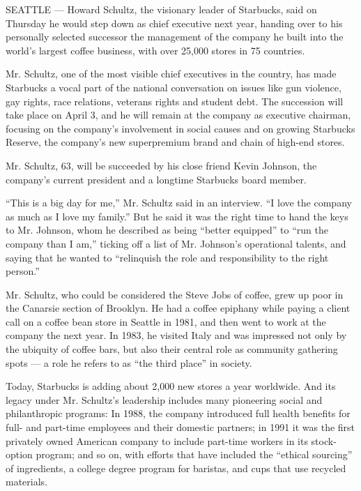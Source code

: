 SEATTLE --- Howard Schultz, the visionary leader of Starbucks, said on
Thursday he would step down as chief executive next year, handing over
to his personally selected successor the management of the company he
built into the world's largest coffee business, with over 25,000 stores
in 75 countries.

Mr. Schultz, one of the most visible chief executives in the country,
has made Starbucks a vocal part of the national conversation on issues
like gun violence, gay rights, race relations, veterans rights and
student debt. The succession will take place on April 3, and he will
remain at the company as executive chairman, focusing on the company's
involvement in social causes and on growing Starbucks Reserve, the
company's new superpremium brand and chain of high-end stores.

Mr. Schultz, 63, will be succeeded by his close friend Kevin Johnson,
the company's current president and a longtime Starbucks board member.

``This is a big day for me,'' Mr. Schultz said in an interview. ``I love
the company as much as I love my family.'' But he said it was the right
time to hand the keys to Mr. Johnson, whom he described as being
``better equipped'' to ``run the company than I am,'' ticking off a list
of Mr. Johnson's operational talents, and saying that he wanted to
``relinquish the role and responsibility to the right person.''

Mr. Schultz, who could be considered the Steve Jobs of coffee, grew up
poor in the Canarsie section of Brooklyn. He had a coffee epiphany while
paying a client call on a coffee bean store in Seattle in 1981, and then
went to work at the company the next year. In 1983, he visited Italy and
was impressed not only by the ubiquity of coffee bars, but also their
central role as community gathering spots --- a role he refers to as
``the third place'' in society.

Today, Starbucks is adding about 2,000 new stores a year worldwide. And
its legacy under Mr. Schultz's leadership includes many pioneering
social and philanthropic programs: In 1988, the company introduced full
health benefits for full- and part-time employees and their domestic
partners; in 1991 it was the first privately owned American company to
include part-time workers in its stock-option program; and so on, with
efforts that have included the ``ethical sourcing'' of ingredients, a
college degree program for baristas, and cups that use recycled
materials.

